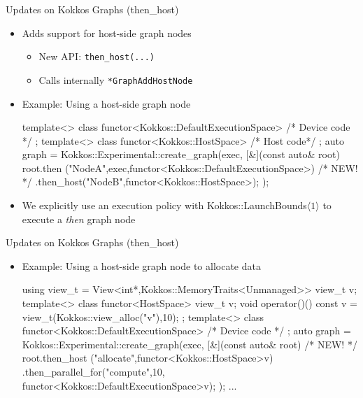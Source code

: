 
\begin{frame}[fragile]{Updates on Kokkos Graphs (then\_host)}
 \begin{itemize}
     \item Adds support for host-side graph nodes    
    \begin{itemize}
      \item New API: \texttt{then\_host(...)}
      \item Calls internally \texttt{*GraphAddHostNode}
    \end{itemize}
 \item Example: Using a host-side graph node
        \begin{code}[keywords={std,class,template,auto}]
    template<>
    class functor<Kokkos::DefaultExecutionSpace>{ /* Device code */ };
    template<>
    class functor<Kokkos::HostSpace> { /* Host code*/ };    
    auto graph = Kokkos::Experimental::create_graph(exec, 
        [&](const auto& root) {
          root.then ("NodeA",exec,functor<Kokkos::DefaultExecutionSpace>{})
          /* NEW! */
          .then_host("NodeB",functor<Kokkos::HostSpace>{});
    });      
      \end{code}
  
  \item We explicitly use an execution policy with Kokkos::LaunchBounds$\langle 1\rangle$ to execute a \emph{then} graph node
 \end{itemize}
\end{frame}



\begin{frame}[fragile]{Updates on Kokkos Graphs (then\_host)}
 \begin{itemize}
 \item Example: Using a host-side graph node to allocate data
        \begin{code}[keywords={std,class,template,auto}]
    using view_t = View<int*,Kokkos::MemoryTraits<Unmanaged>>
    view_t v;
    template<>
    class functor<HostSpace> {
      view_t v;
      void operator()() const { v = view_t(Kokkos::view_alloc("v"),10);}
    };
    template<>
    class functor<Kokkos::DefaultExecutionSpace>{ /* Device code */ };
    auto graph = Kokkos::Experimental::create_graph(exec, 
      [&](const auto& root) {
        /* NEW! */
        root.then_host ("allocate",functor<Kokkos::HostSpace>{v})
        .then_parallel_for("compute",10,
                       functor<Kokkos::DefaultExecutionSpace>{v});
    });  
    ...     
      \end{code}
 \end{itemize}
\end{frame}

